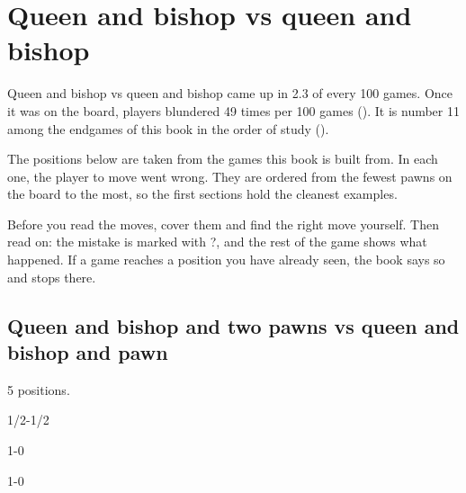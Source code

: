 \chapter{Queen and bishop vs queen and bishop}\label{ch:queen-and-bishop-vs-queen-and-bishop}
Queen and bishop vs queen and bishop came up in 2.3 of every 100 games. Once it was on the board, players blundered 49 times per 100 games (). It is number 11 among the endgames of this book in the order of study ().

The positions below are taken from the games this book is built from. In each one, the player to move went wrong. They are ordered from the fewest pawns on the board to the most, so the first sections hold the cleanest examples.

Before you read the moves, cover them and find the right move yourself. Then read on: the mistake is marked with ?, and the rest of the game shows what happened. If a game reaches a position you have already seen, the book says so and stops there.


\section{Queen and bishop and two pawns vs queen and bishop and pawn}
5 positions.


1/2-1/2\par
{}

1-0\par
{}

1-0\par
{}

